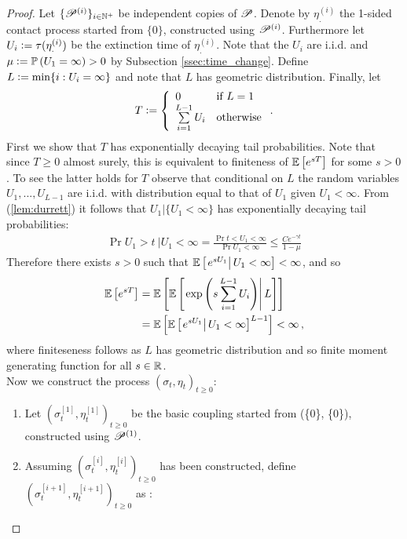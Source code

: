 \begin{proof}
Let $\{ \mathscr{P}^{(i)}\}_{i \in \mathbb{N}^+}$ be independent copies of $\mathscr{P}$. Denote by $\eta^{(i)}_.$ the 1-sided contact process started from $\{0\}$, constructed using $\mathscr{P}^{(i)}$. Furthermore let $U_i \vcentcolon= \tau(\eta^{(i)}_.)$ be the extinction time of $\eta^{(i)}_.$. Note that the $U_i$ are i.i.d. and $\mu \vcentcolon= \mathbb{P} \left( U_1 = \infty \right) > 0$ by Subsection \ref{ssec:time_change}. Define $L \vcentcolon= \min \{ i: U_i = \infty \}$ and note that $L$ has geometric distribution. Finally, let 
\[
T \vcentcolon= 
\left\{
  \begin{array}{ll}
    0                           & \mbox{if } L = 1 \\
    \sum\limits^{L-1}_{i=1} U_i & \mbox{otherwise}
  \end{array}
\right..
\]
First we show that $T$ has exponentially decaying tail probabilities. Note that since $T \geq 0$ almost surely, this is equivalent to finiteness of $\mathbb{E}\left[ e^{s T} \right]$ for some $s > 0$. To see the latter holds for $T$ observe that conditional on $L$ the random variables $U_1, ..., U_{L-1}$ are i.i.d. with distribution equal to that of $U_1$ given $U_1 < \infty$. From (\ref{lem:durrett}) it follows that $U_1 | \{U_1 < \infty \}$ has exponentially decaying tail probabilities:
\begin{align*}
\Pr{U_1 > t\ | U_1 < \infty} = \frac{\Pr{t < U_1 < \infty}}{\Pr{U_1 < \infty}} \leq \frac{C e^{- \gamma t}}{1 - \mu}
\end{align*}
Therefore there exists $s > 0$ such that $\mathbb{E} \left[\left. e^{sU_1} \right| U_1 < \infty \right] < \infty$, and so
\begin{align*}
\mathbb{E}\left[ e^{sT} \right] &= \mathbb{E}\left[ \mathbb{E} \left[\left. \exp\left(s\sum\limits_{i=1}^{L-1} U_i \right) \right| L \right] \right] \\
            &= \mathbb{E}\left[ \mathbb{E} \left[\left. e^{s U_1} \right| U_1 < \infty \right]^{L-1} \right] < \infty \,,
\end{align*}
where finiteseness follows as $L$ has geometric distribution and so finite moment generating function for all $s \in \mathbb{R}$. \\
Now we construct the process $(\sigma_t, \eta_t)_{t \geq 0}$:
\begin{enumerate}
  \item Let $(\sigma^{[1]}_t, \eta^{[1]}_t)_{t \geq 0}$ be the basic coupling started from (\{0\}, \{0\}), constructed using $\mathscr{P}^{(1)}$. 
  \item Assuming $(\sigma^{[i]}_t, \eta^{[i]}_t)_{t \geq 0}$ has been constructed, define $(\sigma^{[i+1]}_t, \eta^{[i+1]}_t)_{t \geq 0}$ as :
  \begin{itemize}

\end{itemize}
\end{enumerate}
\end{proof}
